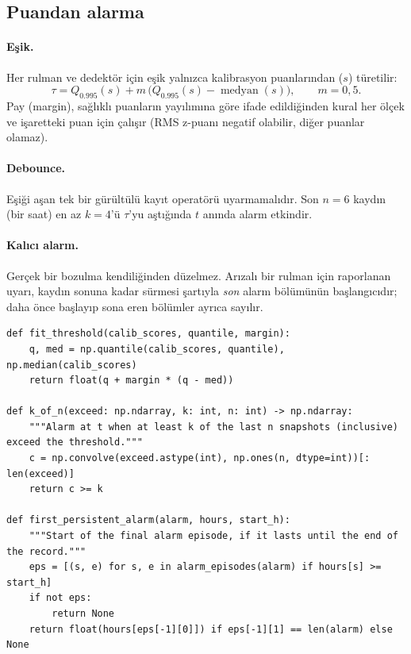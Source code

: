 \documentclass[11pt]{article}
\begin{document}
\subsection{Puandan alarma}
\paragraph{Eşik.} Her rulman ve dedektör için eşik yalnızca kalibrasyon puanlarından ($s$) türetilir:
\begin{equation}
\tau = Q_{0.995}(s) + m\,\bigl(Q_{0.995}(s) - \operatorname{medyan}(s)\bigr), \qquad m = 0{,}5.
\end{equation}
Pay (margin), sağlıklı puanların yayılımına göre ifade edildiğinden kural her ölçek ve işaretteki puan
için çalışır (RMS z-puanı negatif olabilir, diğer puanlar olamaz).

\paragraph{Debounce.} Eşiği aşan tek bir gürültülü kayıt operatörü uyarmamalıdır. Son $n=6$ kaydın
(bir saat) en az $k=4$'ü $\tau$'yu aştığında $t$ anında alarm etkindir.

\paragraph{Kalıcı alarm.} Gerçek bir bozulma kendiliğinden düzelmez. Arızalı bir rulman için raporlanan
uyarı, kaydın sonuna kadar sürmesi şartıyla \emph{son} alarm bölümünün başlangıcıdır; daha önce
başlayıp sona eren bölümler ayrıca sayılır.

\begin{lstlisting}[caption={Eşik, k-of-n debounce ve kalıcı alarm (\code{src/bearing\_efw/alarm.py}).},label=lst:alarm]
def fit_threshold(calib_scores, quantile, margin):
    q, med = np.quantile(calib_scores, quantile), np.median(calib_scores)
    return float(q + margin * (q - med))

def k_of_n(exceed: np.ndarray, k: int, n: int) -> np.ndarray:
    """Alarm at t when at least k of the last n snapshots (inclusive) exceed the threshold."""
    c = np.convolve(exceed.astype(int), np.ones(n, dtype=int))[: len(exceed)]
    return c >= k

def first_persistent_alarm(alarm, hours, start_h):
    """Start of the final alarm episode, if it lasts until the end of the record."""
    eps = [(s, e) for s, e in alarm_episodes(alarm) if hours[s] >= start_h]
    if not eps:
        return None
    return float(hours[eps[-1][0]]) if eps[-1][1] == len(alarm) else None
\end{lstlisting}
\end{document}
